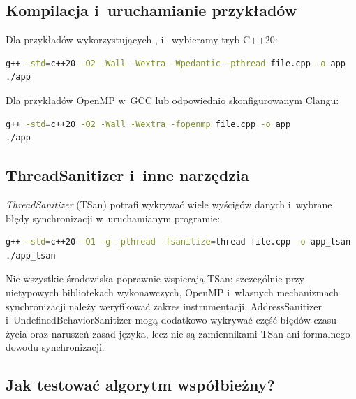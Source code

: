 \subsection{Kompilacja i~uruchamianie przykładów}

Dla przykładów wykorzystujących , 
i~ wybieramy tryb C++20:

\begin{lstlisting}[language=bash,caption={Kompilacja wielowątkowego programu C++20.}]
g++ -std=c++20 -O2 -Wall -Wextra -Wpedantic -pthread file.cpp -o app
./app
\end{lstlisting}

Dla przykładów OpenMP w~GCC lub odpowiednio skonfigurowanym Clangu:
\begin{lstlisting}[language=bash,caption={Włączenie OpenMP.}]
g++ -std=c++20 -O2 -Wall -Wextra -fopenmp file.cpp -o app
./app
\end{lstlisting}

\subsection{ThreadSanitizer i~inne narzędzia}

\emph{ThreadSanitizer} (TSan) potrafi wykrywać wiele wyścigów danych
i~wybrane błędy synchronizacji w~uruchamianym programie:

\begin{lstlisting}[language=bash,caption={Budowanie i uruchamianie z ThreadSanitizer.}]
g++ -std=c++20 -O1 -g -pthread -fsanitize=thread file.cpp -o app_tsan
./app_tsan
\end{lstlisting}

Nie wszystkie środowiska poprawnie wspierają TSan; szczególnie
przy nietypowych bibliotekach wykonawczych, OpenMP i~własnych
mechanizmach synchronizacji należy weryfikować zakres instrumentacji.
AddressSanitizer i~UndefinedBehaviorSanitizer mogą dodatkowo wykrywać
część błędów czasu życia oraz naruszeń zasad języka, lecz nie są
zamiennikami TSan ani formalnego dowodu synchronizacji.

\subsection{Jak testować algorytm współbieżny?}

